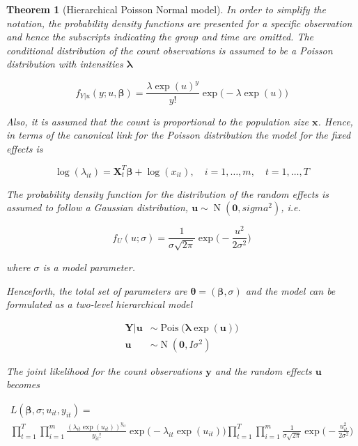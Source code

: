 \documentclass[a4paper,twoside,11pt]{report} %
\DeclareMathOperator{\N}{N}
\DeclareMathOperator{\Pois}{Pois}
\newtheorem{theorem}{Theorem}[chapter]
\theoremstyle{definition}
\theoremstyle{definition}
\theoremstyle{definition}
\theoremstyle{definition}
\theoremstyle{remark}
\begin{document}
\begin{theorem}[Hierarchical Poisson Normal model]
\protect\hypertarget{thm:poisnTheorem}{}\label{thm:poisnTheorem}In order to simplify the notation, the probability density functions are presented for a specific observation and hence the subscripts indicating the group and time are omitted. The conditional distribution of the count observations is assumed to be a Poisson distribution with intensities \(\boldsymbol \lambda\)

\begin{equation}
  f_{Y|u}(y; u, \boldsymbol{\beta})=\frac{\lambda\exp(u)^{y}}{y!}\exp\big(-\lambda\exp(u)\big)
\end{equation}

Also, it is assumed that the count is proportional to the population size \(\boldsymbol{x}\). Hence, in terms of the canonical link for the Poisson distribution the model for the fixed effects is

\begin{equation}
  \log(\lambda_{it})=\boldsymbol{X}_{t}^T\boldsymbol{\beta}+\log(x_{it}), \quad i=1,\dots,m, \quad t=1,\dots,T
\end{equation}

The probability density function for the distribution of the random effects is assumed to follow a Gaussian distribution, \(\boldsymbol u\sim\N(\boldsymbol 0,sigma^2)\), i.e.

\begin{equation}
  f_U(u;\sigma)=\frac{1}{\sigma\sqrt{2\pi}}\exp\Bigg(-\frac{u^2}{2\sigma^2}\Bigg)
\end{equation}

where \(\sigma\) is a model parameter.

Henceforth, the total set of parameters are \(\boldsymbol{\theta}=(\boldsymbol{\beta},\sigma)\) and the model can be formulated as a two-level hierarchical model

\begin{subequations} \label{eq:PoisN}
  \begin{alignat}{2}
    \boldsymbol{Y|u} &\sim \Pois \big( \boldsymbol{\lambda} \exp(\boldsymbol{u}) \big) \label{eq:pois_n0} \\ 
    \boldsymbol{u} &\sim \N(\boldsymbol{0},I\sigma^2) \label{eq:pois_n1}
  \end{alignat}
\end{subequations}

The joint likelihood for the count observations \(\boldsymbol y\) and the random effects \(\boldsymbol u\) becomes

\begin{multline}\label{eq:jnllPoisN}
  L(\boldsymbol{\beta}, \sigma;u_{it},y_{it})=\\
  \prod_{t=1}^{T}\prod_{i=1}^{m} \frac{(\lambda_{it}\exp(u_{it}))^{y_{it}}}{y_{it}!}\exp\big(-\lambda_{it}\exp(u_{it})\big) \prod_{t=1}^{T}\prod_{i=1}^{m} \frac{1}{\sigma\sqrt{2\pi}}\exp\Bigg(-\frac{u_{it}^2}{2\sigma^2}\Bigg)
\end{multline}
\end{theorem}
\end{document}
